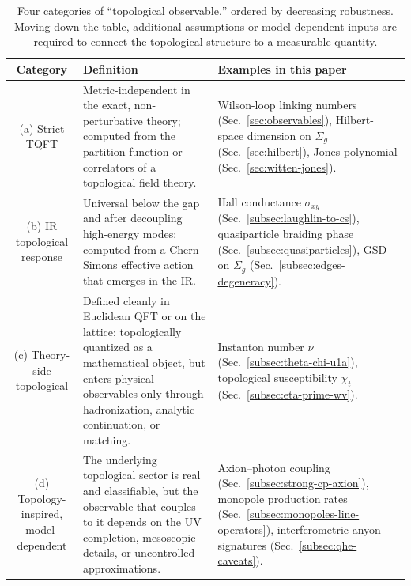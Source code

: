 \begin{table}[ht]
\centering
\renewcommand{\arraystretch}{1.4}
\begin{tabular}{c p{5.8cm} p{5.5cm}}
\hline\hline
\textbf{Category} & \textbf{Definition} & \textbf{Examples in this paper} \\
\hline
(a) Strict TQFT &
Metric-independent in the exact, non-perturbative theory; computed from the partition function or correlators of a topological field theory. &
Wilson-loop linking numbers (Sec.~\ref{sec:observables}), Hilbert-space dimension on $\Sigma_g$ (Sec.~\ref{sec:hilbert}), Jones polynomial (Sec.~\ref{sec:witten-jones}). \\[4pt]
(b) IR topological response &
Universal below the gap and after decoupling high-energy modes; computed from a Chern--Simons effective action that emerges in the IR. &
Hall conductance $\sigma_{xy}$ (Sec.~\ref{subsec:laughlin-to-cs}), quasiparticle braiding phase (Sec.~\ref{subsec:quasiparticles}), GSD on $\Sigma_g$ (Sec.~\ref{subsec:edges-degeneracy}). \\[4pt]
(c) Theory-side topological &
Defined cleanly in Euclidean QFT or on the lattice; topologically quantized as a mathematical object, but enters physical observables only through hadronization, analytic continuation, or matching. &
Instanton number $\nu$ (Sec.~\ref{subsec:theta-chi-u1a}), topological susceptibility $\chi_t$ (Sec.~\ref{subsec:eta-prime-wv}). \\[4pt]
(d) Topology-inspired, model-dependent &
The underlying topological sector is real and classifiable, but the observable that couples to it depends on the UV completion, mesoscopic details, or uncontrolled approximations. &
Axion--photon coupling (Sec.~\ref{subsec:strong-cp-axion}), monopole production rates (Sec.~\ref{subsec:monopoles-line-operators}), interferometric anyon signatures (Sec.~\ref{subsec:qhe-caveats}). \\[4pt]
\hline\hline
\end{tabular}
\caption{Four categories of ``topological observable,'' ordered by decreasing robustness. Moving down the table, additional assumptions or model-dependent inputs are required to connect the topological structure to a measurable quantity.}
\label{tab:observable-taxonomy}
\end{table}

